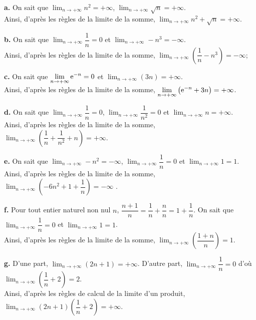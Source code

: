 \documentclass[11pt,fleqn]{book} %
\begin{document}
\begin{solution}\textbf{a.} On sait que $\displaystyle \lim _{n\to +\infty} n^2 = +\infty$, $\displaystyle \lim _{n\to +\infty} \sqrt{n} = +\infty$.\\ Ainsi, d'après les règles de la limite de la somme, $\displaystyle \lim _{n\to +\infty} n^2+\sqrt{n} = +\infty$.

\textbf{b.} On sait que $\displaystyle \lim _{n\to +\infty} \dfrac{1}{n} = 0$ et $\displaystyle \lim _{n\to +\infty} -n^3 = -\infty$.\\ Ainsi, d'après les règles de la limite de la somme, $\displaystyle \lim _{n\to +\infty} \left( \dfrac{1}{n}-n^3 \right) = -\infty$;

\textbf{c.} On sait que $\displaystyle \lim _{n\to +\infty} \mathrm{e}^{-n} = 0$ et $\displaystyle \lim _{n\to +\infty} (3n)= +\infty$.\\ Ainsi, d'après les règles de la limite de la somme, $\displaystyle \lim _{n\to +\infty} \left(\mathrm{e}^{-n}+3n\right) = +\infty$.

\textbf{d.} On sait que $\displaystyle \lim _{n\to +\infty} \dfrac{1}{n} = 0$, $\displaystyle \lim _{n\to +\infty} \dfrac{1}{n^2} = 0$ et $\displaystyle \lim _{n\to +\infty} n = +\infty$.\\ Ainsi, d'après les règles de la limite de la somme, $\displaystyle \lim _{n\to +\infty} \left( \dfrac{1}{n}+\dfrac{1}{n^2}+n \right) = +\infty$.
 
\textbf{e.} On sait que $\displaystyle \lim _{n\to +\infty}-n^2 = -\infty$, $\displaystyle \lim _{n\to +\infty} \dfrac{1}{n} = 0$ et $\displaystyle \lim _{n\to +\infty} 1 = 1$.\\ Ainsi, d'après les règles de la limite de la somme, $\displaystyle \lim _{n\to +\infty} \left( -6n^2+1+ \dfrac{1}{n} \right) = -\infty$ .

\textbf{f.} Pour tout entier naturel non nul $n$, $\dfrac{n+1}{n}=\dfrac{1}{n}+\dfrac{n}{n}=1+\dfrac{1}{n}$. On sait que $\displaystyle \lim _{n\to +\infty} \dfrac{1}{n} = 0$ et $\displaystyle \lim _{n\to +\infty} 1 = 1$.\\ Ainsi, d'après les règles de la limite de la somme, $\displaystyle \lim _{n\to +\infty} \left( \dfrac{1+n}{n} \right) = 1$.
 
\textbf{g.} D'une part, $\displaystyle \lim _{n\to +\infty} (2n+1) = +\infty$. D'autre part, $\displaystyle \lim _{n\to +\infty} \dfrac{1}{n} = 0$ d'où $\displaystyle \lim _{n\to +\infty} \left(\dfrac{1}{n}+2\right) = 2$.\\ Ainsi, d'après les règles de calcul de la limite d'un produit, $\displaystyle \lim _{n\to +\infty} (2n+1)\left(\dfrac{1}{n}+2\right) = +\infty$.
 

\end{solution}
\end{document}
